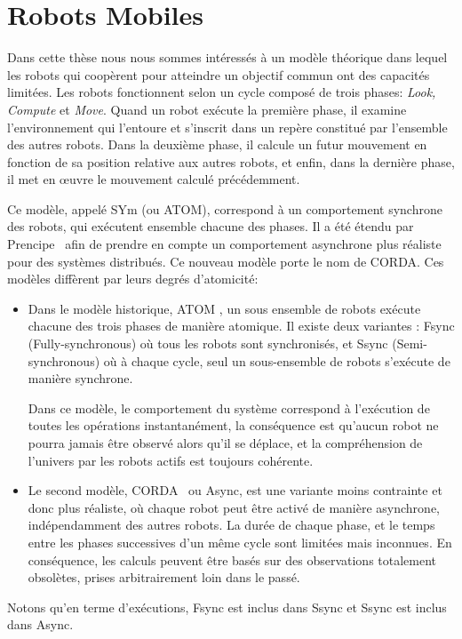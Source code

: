 \section{Robots Mobiles}
Dans cette thèse nous nous sommes intéressés à un modèle théorique
\cite{suzuki_distributed_1999,FPS12} dans lequel les robots qui
coopèrent pour atteindre un objectif commun ont des capacités
limitées.  Les robots fonctionnent selon un cycle composé de trois
phases: \emph{Look, Compute} et \emph{Move}. Quand un robot exécute la
première phase, il examine l'environnement qui l'entoure et s'inscrit
dans un repère constitué par l'ensemble des autres robots. Dans la
deuxième phase, il calcule un futur mouvement en fonction de sa
position relative aux autres robots, et enfin, dans la dernière phase,
il met en \oe{}uvre le mouvement calculé précédemment.
 
Ce modèle, appelé SYm (ou ATOM), correspond à un comportement
synchrone des robots, qui exécutent ensemble chacune des
phases. Il a été étendu par Prencipe~\cite{prencipe_new_2000} afin
de prendre en compte un comportement asynchrone plus réaliste pour des
systèmes distribués. Ce nouveau modèle porte le nom de CORDA.  Ces
modèles diffèrent par leurs degrés d'atomicité:
\begin{itemize}
\item Dans le modèle historique, ATOM \cite{suzuki_distributed_1999},
  un sous ensemble de robots exécute chacune des trois phases de manière
  atomique. Il existe deux variantes : Fsync (Fully-synchronous) où tous
  les robots sont synchronisés, et Ssync (Semi-synchronous) où à
  chaque cycle, seul un sous-ensemble de robots s'exécute de manière
  synchrone.

  Dans ce modèle, le comportement du système correspond à l'exécution
  de toutes les opérations instantanément, la conséquence est qu'aucun
  robot ne pourra jamais être observé alors qu'il se déplace, et la
  compréhension de l'univers par les robots actifs est toujours
  cohérente.
\item Le second modèle, CORDA~\cite{prencipe_new_2000} ou Async, est
  une variante moins contrain\-te et donc plus réaliste, où chaque robot
  peut être activé de manière asynchrone, indépendamment des autres
  robots. La durée de chaque phase, et le temps entre les phases
  successives d'un même cycle sont limitées mais inconnues. En
  conséquence, les calculs peuvent être basés sur des observations
  totalement obsolètes, prises arbitrairement loin dans le passé.
\end{itemize}
Notons qu'en terme d'exécutions, Fsync est inclus dans Ssync et Ssync
est inclus dans Async.  \bigskip

